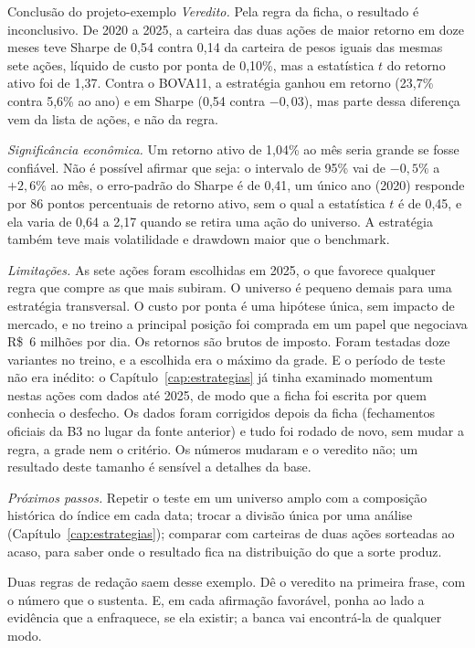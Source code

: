 \begin{exemplo}{Conclusão do projeto-exemplo}
\emph{Veredito.} Pela regra da ficha, o resultado é inconclusivo. De 2020 a 2025, a carteira das duas ações de maior retorno em doze meses teve Sharpe de 0,54 contra 0,14 da carteira de pesos iguais das mesmas sete ações, líquido de custo por ponta de 0,10\%, mas a estatística $t$ do retorno ativo foi de 1,37. Contra o BOVA11, a estratégia ganhou em retorno (23,7\% contra 5,6\% ao ano) e em Sharpe (0,54 contra $-0,03$), mas parte dessa diferença vem da lista de ações, e não da regra.

\emph{Significância econômica.} Um retorno ativo de 1,04\% ao mês seria grande se fosse confiável. Não é possível afirmar que seja: o intervalo de 95\% vai de $-0,5\%$ a $+2,6\%$ ao mês, o erro-padrão do Sharpe é de 0,41, um único ano (2020) responde por 86 pontos percentuais de retorno ativo, sem o qual a estatística $t$ é de 0,45, e ela varia de 0,64 a 2,17 quando se retira uma ação do universo. A estratégia também teve mais volatilidade e drawdown maior que o benchmark.

\emph{Limitações.} As sete ações foram escolhidas em 2025, o que favorece qualquer regra que compre as que mais subiram. O universo é pequeno demais para uma estratégia transversal. O custo por ponta é uma hipótese única, sem impacto de mercado, e no treino a principal posição foi comprada em um papel que negociava R\$~6 milhões por dia. Os retornos são brutos de imposto. Foram testadas doze variantes no treino, e a escolhida era o máximo da grade. E o período de teste não era inédito: o Capítulo~\ref{cap:estrategias} já tinha examinado momentum nestas ações com dados até 2025, de modo que a ficha foi escrita por quem conhecia o desfecho. Os dados foram corrigidos depois da ficha (fechamentos oficiais da B3 no lugar da fonte anterior) e tudo foi rodado de novo, sem mudar a regra, a grade nem o critério. Os números mudaram e o veredito não; um resultado deste tamanho é sensível a detalhes da base.

\emph{Próximos passos.} Repetir o teste em um universo amplo com a composição histórica do índice em cada data; trocar a divisão única por uma análise  (Capítulo~\ref{cap:estrategias}); comparar com carteiras de duas ações sorteadas ao acaso, para saber onde o resultado fica na distribuição do que a sorte produz.
\end{exemplo}

Duas regras de redação saem desse exemplo. Dê o veredito na primeira frase, com o número que o sustenta. E, em cada afirmação favorável, ponha ao lado a evidência que a enfraquece, se ela existir; a banca vai encontrá-la de qualquer modo.

